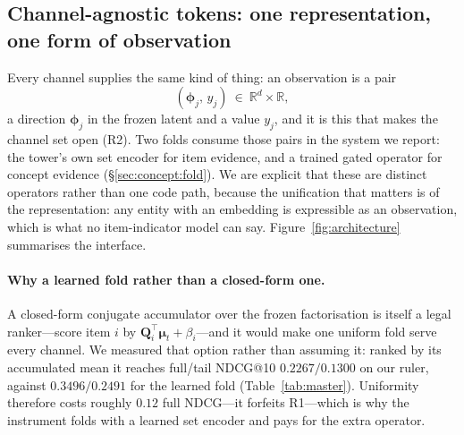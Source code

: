 \documentclass[11pt]{article}
\newcommand{\R}{\mathbb{R}}
\newcommand{\Q}{\mathbf{Q}}
\newcommand{\bphi}{\boldsymbol{\phi}}
\newcommand{\bmu}{\boldsymbol{\mu}}
\begin{document}
\subsection{Channel-agnostic tokens: one representation, one form of observation}
Every channel supplies the same kind of thing: an observation is a pair
\begin{equation}\label{eq:obs}
  (\bphi_j,\,y_j)\ \in\ \R^{d}\times\R,
\end{equation}
a direction $\bphi_j$ in the frozen latent and a value $y_j$, and it is this that makes the channel set open (R2).
Two folds consume those pairs in the system we
report: the tower's own set encoder for item evidence, and a trained gated operator for concept evidence
(\S\ref{sec:concept:fold}). We are explicit that these are distinct operators rather than one code path, because the
unification that matters is of the representation: any entity with an embedding is expressible as an observation,
which is what no item-indicator model can say. Figure~\ref{fig:architecture} summarises the interface.

\paragraph{Why a learned fold rather than a closed-form one.} A closed-form conjugate accumulator over the frozen
factorisation is itself a legal ranker---score item $i$ by $\Q_i^\top\bmu_t+\beta_i$---and it would make one
uniform fold serve every channel. We measured that option rather than assuming it: ranked by its accumulated mean
it reaches full/tail NDCG@10 $0.2267/0.1300$ on our ruler, against $0.3496/0.2491$ for the learned fold
(Table~\ref{tab:master}). Uniformity therefore costs roughly $0.12$ full NDCG---it forfeits R1---which is why the
instrument folds with a learned set encoder and pays for the extra operator.
\end{document}
